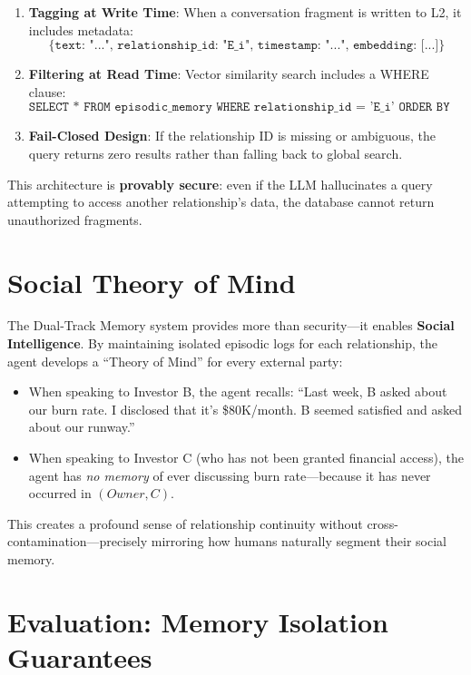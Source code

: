 \begin{enumerate}
    \item \textbf{Tagging at Write Time}: When a conversation fragment is written to L2, it includes metadata:
    \[
    \texttt{\{text: "...", relationship\_id: "E\_i", timestamp: "...", embedding: [...]\}}
    \]

    \item \textbf{Filtering at Read Time}: Vector similarity search includes a WHERE clause:
    \[
    \texttt{SELECT * FROM episodic\_memory WHERE relationship\_id = 'E\_i' ORDER BY similarity(...)}
    \]

    \item \textbf{Fail-Closed Design}: If the relationship ID is missing or ambiguous, the query returns zero results rather than falling back to global search.
\end{enumerate}

This architecture is \textbf{provably secure}: even if the LLM hallucinates a query attempting to access another relationship's data, the database cannot return unauthorized fragments.

\section{Social Theory of Mind}

The Dual-Track Memory system provides more than security—it enables \textbf{Social Intelligence}. By maintaining isolated episodic logs for each relationship, the agent develops a ``Theory of Mind'' for every external party:

\begin{itemize}
    \item When speaking to Investor B, the agent recalls: ``Last week, B asked about our burn rate. I disclosed that it's \$80K/month. B seemed satisfied and asked about our runway.''

    \item When speaking to Investor C (who has not been granted financial access), the agent has \textit{no memory} of ever discussing burn rate—because it has never occurred in $(Owner, C)$.
\end{itemize}

This creates a profound sense of relationship continuity without cross-contamination—precisely mirroring how humans naturally segment their social memory.

\section{Evaluation: Memory Isolation Guarantees}

